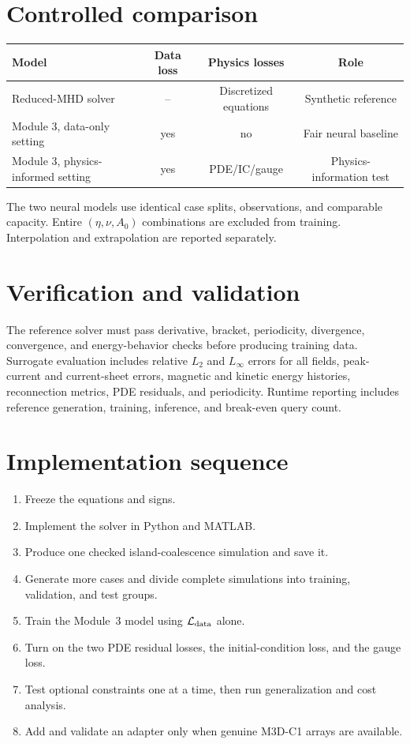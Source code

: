 \documentclass[11pt]{article}
\begin{document}
\section{Controlled comparison}
\begin{center}
\begin{tabularx}{\textwidth}{Yccc}
\toprule
\textbf{Model} & \textbf{Data loss} & \textbf{Physics losses} & \textbf{Role}\\
\midrule
Reduced-MHD solver & -- & Discretized equations & Synthetic reference\\
Module 3, data-only setting & yes & no & Fair neural baseline\\
Module 3, physics-informed setting & yes & PDE/IC/gauge & Physics-information test\\
\bottomrule
\end{tabularx}
\end{center}
The two neural models use identical case splits, observations, and comparable capacity. Entire $(\eta,\nu,A_0)$ combinations are excluded from training. Interpolation and extrapolation are reported separately.

\section{Verification and validation}
The reference solver must pass derivative, bracket, periodicity, divergence, convergence, and energy-behavior checks before producing training data. Surrogate evaluation includes relative $L_2$ and $L_\infty$ errors for all fields, peak-current and current-sheet errors, magnetic and kinetic energy histories, reconnection metrics, PDE residuals, and periodicity. Runtime reporting includes reference generation, training, inference, and break-even query count.

\clearpage
\section{Implementation sequence}
\begin{enumerate}[leftmargin=2em]
\item Freeze the equations and signs.
\item Implement the solver in Python and MATLAB.
\item Produce one checked island-coalescence simulation and save it.
\item Generate more cases and divide complete simulations into training, validation, and test groups.
\item Train the Module~3 model using $\mathcal L_{\rm data}$ alone.
\item Turn on the two PDE residual losses, the initial-condition loss, and the gauge loss.
\item Test optional constraints one at a time, then run generalization and cost analysis.
\item Add and validate an adapter only when genuine M3D-C1 arrays are available.
\end{enumerate}
\end{document}
